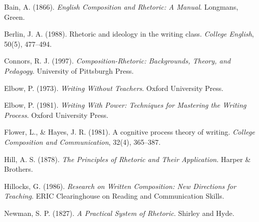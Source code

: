 \documentclass[12pt]{article}
\begin{document}
Bain, A. (1866). \textit{English Composition and Rhetoric: A Manual}. Longmans, Green.

Berlin, J. A. (1988). Rhetoric and ideology in the writing class. \textit{College English}, 50(5), 477--494.

Connors, R. J. (1997). \textit{Composition-Rhetoric: Backgrounds, Theory, and Pedagogy}. University of Pittsburgh Press.

Elbow, P. (1973). \textit{Writing Without Teachers}. Oxford University Press.

Elbow, P. (1981). \textit{Writing With Power: Techniques for Mastering the Writing Process}. Oxford University Press.

Flower, L., \& Hayes, J. R. (1981). A cognitive process theory of writing. \textit{College Composition and Communication}, 32(4), 365--387.

Hill, A. S. (1878). \textit{The Principles of Rhetoric and Their Application}. Harper \& Brothers.

Hillocks, G. (1986). \textit{Research on Written Composition: New Directions for Teaching}. ERIC Clearinghouse on Reading and Communication Skills.

Newman, S. P. (1827). \textit{A Practical System of Rhetoric}. Shirley and Hyde.
\end{document}
